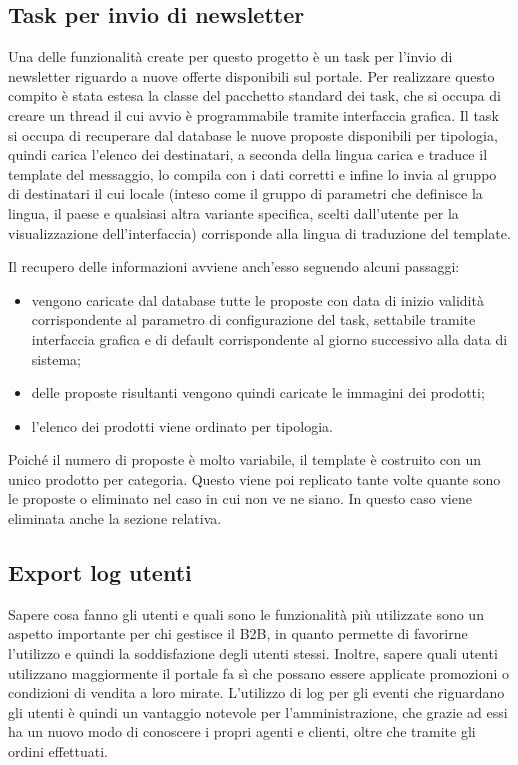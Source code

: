 \subsection{Task per invio di newsletter}\label{sec:task}
Una delle funzionalità create per questo progetto è un task per l'invio di newsletter riguardo a nuove offerte disponibili sul portale. Per realizzare questo compito è stata estesa la classe del pacchetto standard dei task, che si occupa di creare un thread il cui avvio è programmabile tramite interfaccia grafica. Il task si occupa di recuperare dal database le nuove proposte disponibili per tipologia, quindi carica l'elenco dei destinatari, a seconda della lingua carica e traduce il template del messaggio, lo compila con i dati corretti e infine lo invia al gruppo di destinatari il cui locale (inteso come il gruppo di parametri che definisce la lingua, il paese e qualsiasi altra variante specifica, scelti dall'utente per la visualizzazione dell'interfaccia) corrisponde alla lingua di traduzione del template.

Il recupero delle informazioni avviene anch'esso seguendo alcuni passaggi:
\begin{itemize}
	\item vengono caricate dal database tutte le proposte con data di inizio validità corrispondente al parametro di configurazione del task, settabile tramite interfaccia grafica e di default corrispondente al giorno successivo alla data di sistema;
	\item delle proposte risultanti vengono quindi caricate le immagini dei prodotti;
	\item l'elenco dei prodotti viene ordinato per tipologia.
\end{itemize}
Poiché il numero di proposte è molto variabile, il template è costruito con un unico prodotto per categoria. Questo viene poi replicato tante volte quante sono le proposte o eliminato nel caso in cui non ve ne siano. In questo caso viene eliminata anche la sezione relativa.


\subsection{Export log utenti}
Sapere cosa fanno gli utenti e quali sono le funzionalità più utilizzate sono un aspetto importante per chi gestisce il B2B, in quanto permette di favorirne l'utilizzo e quindi la soddisfazione degli utenti stessi. Inoltre, sapere quali utenti utilizzano maggiormente il portale fa sì che possano essere applicate promozioni o condizioni di vendita a loro mirate. L'utilizzo di log per gli eventi che riguardano gli utenti è quindi un vantaggio notevole per l'amministrazione, che grazie ad essi ha un nuovo modo di conoscere i propri agenti e clienti, oltre che tramite gli ordini effettuati.

